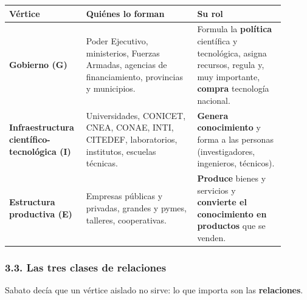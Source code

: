 \begin{center}
\end{center}

\begin{center}
\small
\begin{tabular}{|p{0.22\linewidth}|p{0.38\linewidth}|p{0.30\linewidth}|}
\hline
\textbf{Vértice} & \textbf{Quiénes lo forman} & \textbf{Su rol} \\ \hline
\textbf{Gobierno (G)} & Poder Ejecutivo, ministerios, Fuerzas Armadas, agencias de
financiamiento, provincias y municipios. & Formula la \textbf{política} científica y
tecnológica, asigna recursos, regula y, muy importante, \textbf{compra} tecnología nacional. \\ \hline
\textbf{Infraestructura científico-tecnológica (I)} & Universidades, CONICET, CNEA, CONAE,
INTI, CITEDEF, laboratorios, institutos, escuelas técnicas. & \textbf{Genera conocimiento} y
forma a las personas (investigadores, ingenieros, técnicos). \\ \hline
\textbf{Estructura productiva (E)} & Empresas públicas y privadas, grandes y pymes, talleres,
cooperativas. & \textbf{Produce} bienes y servicios y \textbf{convierte el conocimiento en
productos} que se venden. \\ \hline
\end{tabular}
\end{center}

\subsubsection*{3.3. Las tres clases de relaciones}
Sabato decía que un vértice aislado no sirve: lo que importa son las \textbf{relaciones}.

